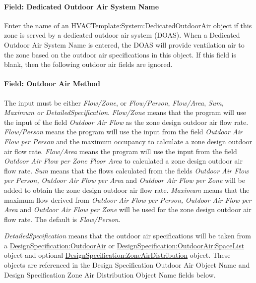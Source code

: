 \paragraph{Field: Dedicated Outdoor Air System Name}\label{field-dedicated-outdoor-air-system-name}

Enter the name of an \hyperref[hvactemplatesystemdedicatedoutdoorair]{HVACTemplate:System:DedicatedOutdoorAir} object if this zone is served by a dedicated outdoor air system (DOAS). When a Dedicated Outdoor Air System Name is entered, the DOAS will provide ventilation air to the zone based on the outdoor air specifications in this object. If this field is blank, then the following outdoor air fields are ignored.

\paragraph{Field: Outdoor Air Method}\label{field-outdoor-air-method-1}

The input must be either \emph{Flow/Zone}, or \emph{Flow/Person}, \emph{Flow/Area}, \emph{Sum}, \emph{Maximum or DetailedSpecification}. \emph{Flow/Zone} means that the program will use the input of the field \emph{Outdoor Air Flow} as the zone design outdoor air flow rate. \emph{Flow/Person} means the program will use the input from the field \emph{Outdoor Air Flow per Person} and the maximum occupancy to calculate a zone design outdoor air flow rate. \emph{Flow/Area} means the program will use the input from the field \emph{Outdoor Air Flow per Zone Floor Area} to calculated a zone design outdoor air flow rate. \emph{Sum} means that the flows calculated from the fields \emph{Outdoor Air Flow per Person,} \emph{Outdoor Air Flow per Area} and \emph{Outdoor Air Flow per Zone} will be added to obtain the zone design outdoor air flow rate. \emph{Maximum} means that the maximum flow derived from \emph{Outdoor Air Flow per Person,} \emph{Outdoor Air Flow per Area} and \emph{Outdoor Air Flow per Zone} will be used for the zone design outdoor air flow rate. The default is \emph{Flow/Person}.

\emph{DetailedSpecification} means that the outdoor air specifications will be taken from a \hyperref[designspecificationoutdoorair]{DesignSpecification:OutdoorAir} or \hyperref[designspecificationoutdoorairspacelist]{DesignSpecification:OutdoorAir:SpaceList} object and optional \hyperref[designspecificationzoneairdistribution]{DesignSpecification:ZoneAirDistribution} object. These objects are referenced in the Design Specification Outdoor Air Object Name and Design Specification Zone Air Distribution Object Name fields below.


